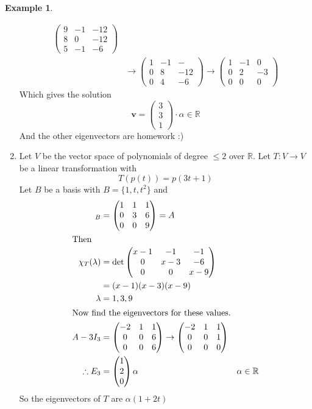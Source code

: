 \documentclass{report}
\theoremstyle{remark}
\theoremstyle{definition}
\theoremstyle{definition}
\newtheorem{example}[theorem]{Example}
\theoremstyle{theorem}
\renewcommand{\v}[1]{\mathbf{#1}}
\providecommand{\vectiii}[3]{\begin{pmatrix}#1\\#2\\#3\end{pmatrix}}
\begin{document}
\begin{example}
\begin{enumerate}[label=(\arabic*)]
\begin{align*}
\begin{pmatrix}
        9&-1&-12\\
        8&0&-12\\
        5&-1&-6
        \end{pmatrix}\\
        &\rightarrow\begin{pmatrix}
        1&-1&-\\
        0&8&-12\\
        0&4&-6
        \end{pmatrix} \rightarrow \begin{pmatrix}
        1&-1&0\\
        0&2&-3\\
        0&0&0
        \end{pmatrix}
    \end{align*}
    Which gives the solution 
    \[\v{v}=\vectiii{3}{3}{1} \cdot \alpha \in \mathbb{R}\]
    And the other eigenvectors are homework :)
    \item Let $V$ be the vector space of polynomials of degree $\leq 2$ over $\mathbb{R}$. Let $T:V\rightarrow V$ be a linear transformation with
    \[T(p(t))=p(3t+1)\]
    Let $B$ be a basis with $B=\{1,t,t^2\}$ and \begin{align*}
        [T]_B &= \begin{pmatrix}
        1&1&1\\
        0&3&6\\
        0&0&9
        \end{pmatrix} = A\\
        \intertext{Then}
        \chi_T(\lambda)&=\det\begin{pmatrix}
        x-1&-1&-1\\
        0&x-3&-6\\
        0&0&x-9
        \end{pmatrix}\\
        &=(x-1)(x-3)(x-9)\\
        \lambda&=1,3,9\\
        \intertext{Now find the eigenvectors for these values.}
        A-3I_3&=\begin{pmatrix}
        -2&1&1\\
        0&0&6\\
        0&0&6
        \end{pmatrix} \rightarrow \begin{pmatrix}
        -2&1&1\\
        0&0&1\\
        0&0&0
        \end{pmatrix}\\
        \therefore E_3&=\vectiii{1}{2}{0}\alpha&\alpha \in \mathbb{R}
    \end{align*}
    So the eigenvectors of $T$ are $\alpha(1+2t)$


\end{enumerate}
\end{example}
\end{document}
